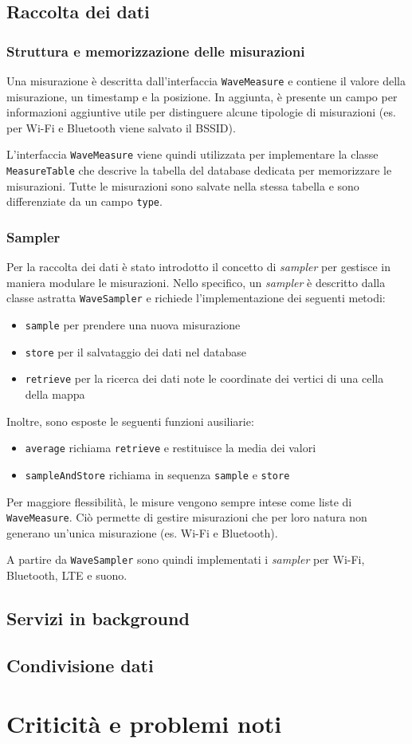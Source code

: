 \documentclass[11pt]{article}
\begin{document}
\subsection{Raccolta dei dati}

\subsubsection{Struttura e memorizzazione delle misurazioni}
Una misurazione è descritta dall'interfaccia \texttt{WaveMeasure} e contiene il valore della misurazione, un timestamp e la posizione. 
In aggiunta, è presente un campo per informazioni aggiuntive utile per distinguere alcune tipologie di misurazioni (es. per Wi-Fi e Bluetooth viene salvato il BSSID).

L'interfaccia \texttt{WaveMeasure} viene quindi utilizzata per implementare la classe \texttt{MeasureTable} che descrive la tabella del database dedicata per memorizzare le misurazioni. 
Tutte le misurazioni sono salvate nella stessa tabella e sono differenziate da un campo \texttt{type}.


\subsubsection{Sampler}
Per la raccolta dei dati è stato introdotto il concetto di \textit{sampler} per gestisce in maniera modulare le misurazioni.
Nello specifico, un \textit{sampler} è descritto dalla classe astratta \texttt{WaveSampler} e richiede l'implementazione dei seguenti metodi:
\begin{itemize}
    \item \texttt{sample} per prendere una nuova misurazione
    \item \texttt{store} per il salvataggio dei dati nel database
    \item \texttt{retrieve} per la ricerca dei dati note le coordinate dei vertici di una cella della mappa
\end{itemize}
Inoltre, sono esposte le seguenti funzioni ausiliarie:
\begin{itemize}
    \item \texttt{average} richiama \texttt{retrieve} e restituisce la media dei valori
    \item \texttt{sampleAndStore} richiama in sequenza \texttt{sample} e \texttt{store}
\end{itemize}
Per maggiore flessibilità, le misure vengono sempre intese come liste di \texttt{WaveMeasure}. Ciò permette di gestire misurazioni che per loro natura non generano un'unica misurazione (es. Wi-Fi e Bluetooth).

A partire da \texttt{WaveSampler} sono quindi implementati i \textit{sampler} per Wi-Fi, Bluetooth, LTE e suono.


\subsection{Servizi in background}


\subsection{Condivisione dati}


\section{Criticità e problemi noti}
\end{document}
